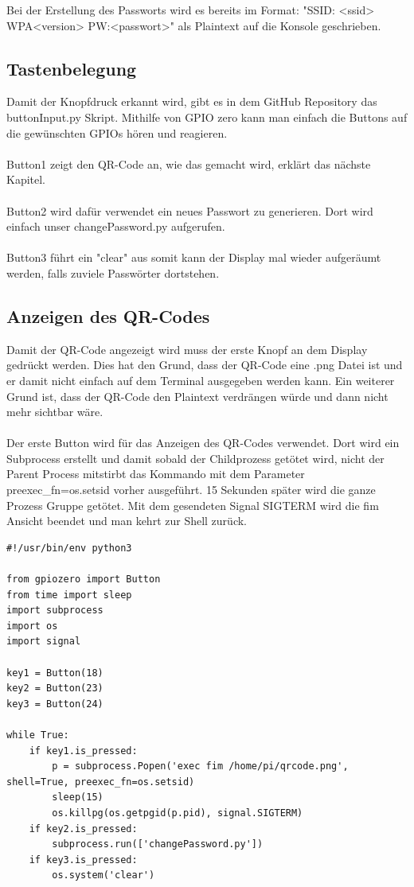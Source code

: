 \documentclass[a4paper,11pt,singlespacing]{article}
\begin{document}
    		Bei der Erstellung des Passworts wird es bereits im Format: "SSID: <ssid> WPA<version> PW:<passwort>" als Plaintext auf die Konsole geschrieben.
    		
    		\subsection{Tastenbelegung}
    		    Damit der Knopfdruck erkannt wird, gibt es in dem GitHub Repository \cite{Quote_github_repo} das buttonInput.py Skript. Mithilfe von GPIO zero kann man einfach die Buttons auf die gewünschten GPIOs hören und reagieren. \\ \\
	    		Button1 zeigt den QR-Code an, wie das gemacht wird, erklärt das nächste Kapitel. \\ \\
	    		Button2 wird dafür verwendet ein neues Passwort zu generieren. Dort wird einfach unser changePassword.py aufgerufen. \\ \\
	    		Button3 führt ein "clear" aus somit kann der Display mal wieder aufgeräumt werden, falls zuviele Passwörter dortstehen.
    		
    		\subsection{Anzeigen des QR-Codes}
    			Damit der QR-Code angezeigt wird muss der erste Knopf an dem Display gedrückt werden. Dies hat den Grund, dass der QR-Code eine .png Datei ist und er damit nicht einfach auf dem Terminal ausgegeben werden kann. Ein weiterer Grund ist, dass der QR-Code den Plaintext verdrängen würde und dann nicht mehr sichtbar wäre. \\ \\
    			Der erste Button wird für das Anzeigen des QR-Codes verwendet. Dort wird ein Subprocess erstellt und damit sobald der Childprozess getötet wird, nicht der Parent Process mitstirbt das Kommando mit dem Parameter preexec\_fn=os.setsid vorher ausgeführt. 15 Sekunden später wird die ganze Prozess Gruppe getötet. Mit dem gesendeten Signal SIGTERM wird die fim Ansicht beendet und man kehrt zur Shell zurück. \\ 
    			\begin{lstlisting}
#!/usr/bin/env python3

from gpiozero import Button
from time import sleep
import subprocess
import os
import signal

key1 = Button(18)
key2 = Button(23)
key3 = Button(24)

while True:
	if key1.is_pressed:
		p = subprocess.Popen('exec fim /home/pi/qrcode.png', shell=True, preexec_fn=os.setsid)
		sleep(15)
		os.killpg(os.getpgid(p.pid), signal.SIGTERM)
	if key2.is_pressed:
		subprocess.run(['changePassword.py'])
	if key3.is_pressed:
		os.system('clear')
    			\end{lstlisting}
    
\end{document}
